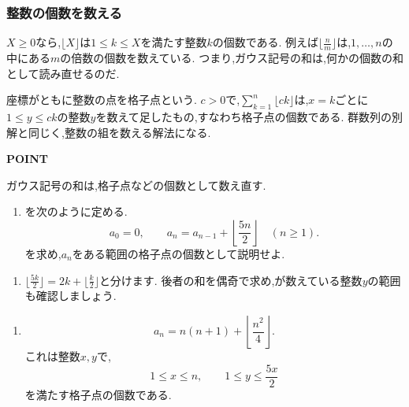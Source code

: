 \subsubsection{整数の個数を数える}\label{節：整数の個数を数える}
$X\ge0$なら,$\lfloor X\rfloor$は$1\le k\le X$を満たす整数$k$の個数である.
例えば$\lfloor \frac{n}{m}\rfloor$は,$1,\ldots,n$の中にある$m$の倍数の個数を数えている.
つまり,ガウス記号の和は,何かの個数の和として読み直せるのだ.

座標がともに整数の点を格子点という.
$c>0$で,$\sum_{k=1}^{n}\lfloor ck\rfloor$は,$x=k$ごとに$1\le y\le ck$の整数$y$を数えて足したもの,すなわち格子点の個数である.
群数列の別解と同じく,整数の組を数える解法になる.

\begin{bookpoint}
  \textbf{POINT}\par
  ガウス記号の和は,格子点などの個数として数え直す.
\end{bookpoint}

\noindent {}\par\nobreak
\begin{enumerate}[label=(\arabic*),parsep=3pt,beginpenalty=10000,format=\bookitemlink{example-gauss-role-10}{problem}{answer}]
  \item {}を次のように定める.
    \[
      a_0=0,\qquad
      a_n=a_{n-1}+\left\lfloor\frac{5n}{2}\right\rfloor
      \quad(n\ge1).
    \]
    を求め,$a_n$をある範囲の格子点の個数として説明せよ.
\end{enumerate}

\noindent {}\par\nobreak
\begin{enumerate}[label=(\arabic*),parsep=3pt,beginpenalty=10000,format=\bookitemlink{example-gauss-role-10}{hint}{problem}]
  \item $\lfloor\frac{5k}{2}\rfloor=2k+\lfloor\frac k2\rfloor$と分けます.
    後者の和を偶奇で求め,が数えている整数$y$の範囲も確認しましょう.
\end{enumerate}

\noindent {}\par\nobreak
\begin{enumerate}[label=(\arabic*),parsep=3pt,beginpenalty=10000,format=\bookitemlink{example-gauss-role-10}{answer}{problem}]
  \item \[
      a_n=n(n+1)+\left\lfloor\frac{n^2}{4}\right\rfloor.
    \]
    これは整数$x,y$で,
    \[
      1\le x\le n,\qquad 1\le y\le\frac{5x}{2}
    \]
    を満たす格子点の個数である.
\end{enumerate}

